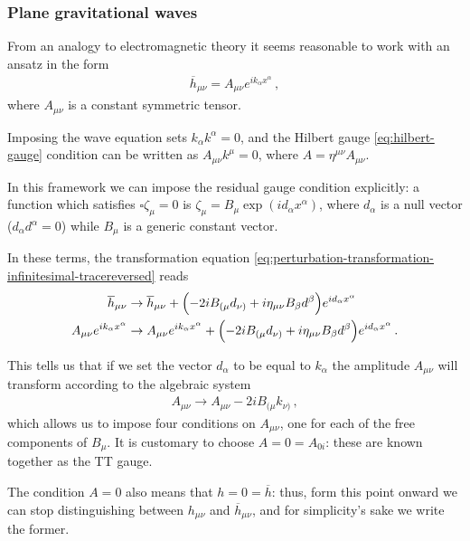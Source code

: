 \documentclass[main.tex]{subfiles}
\begin{document}
\subsubsection{Plane gravitational waves}

From an analogy to electromagnetic theory it seems reasonable to work with an ansatz in the form 
%
\begin{align}
\overline{h}_{\mu \nu } = A_{\mu \nu } e^{i k_\alpha x^{\alpha }}
\,,
\end{align}
%
where \(A_{\mu \nu }\) is a constant symmetric tensor.

Imposing the wave equation sets \(k_{\alpha } k^{\alpha } = 0\), and the Hilbert gauge \eqref{eq:hilbert-gauge} condition can be written as \(A_{\mu \nu } k^{\mu } = 0\), where \(A = \eta^{\mu \nu } A_{\mu \nu }\). 

In this framework we can impose the residual gauge condition explicitly: a function which satisfies \(\square \zeta_{\mu } = 0\) is \(\zeta_{\mu } = B_{\mu } \exp(i d_\alpha x^{\alpha })\), where \(d_\alpha \) is a null vector (\(d_\alpha d^{\alpha } = 0\)) while \(B_\mu \) is a generic constant vector.

In these terms, the transformation equation \eqref{eq:perturbation-transformation-infinitesimal-tracereversed} reads 
%
\begin{align}
\overline{h}_{\mu \nu } &\to \overline{h}_{\mu \nu } + \qty(- 2 i B_{(\mu } d_{\nu )}  + i \eta_{\mu \nu } B_{\beta } d^{\beta } ) e^{i d_\alpha x^{\alpha }} \\
A_{\mu \nu } e^{i k_\alpha x^{\alpha }} &\to A_{\mu \nu } e^{i k_\alpha x^{\alpha }} + \qty(-2 i B_{(\mu } d_{\nu )} + i \eta_{\mu \nu } B_{\beta } d^{\beta }) e^{i d_\alpha x^{\alpha }} 
\,.
\end{align}

This tells us that if we set the vector \(d_{\alpha }\) to be equal to \(k_\alpha \) the amplitude \(A_{\mu \nu }\) will transform according to the algebraic system
%
\begin{align}
A_{\mu \nu } \to A_{\mu \nu } - 2 i B_{(\mu } k_{\nu )}
\,,
\end{align}
%
which allows us to impose four conditions on \(A_{\mu \nu }\), one for each of the free components of \(B_{\mu }\). 
It is customary to choose \(A = 0 = A_{0 i }\): these are known together as the \ac{TT} gauge. 

The condition \(A = 0\) also means that \(h = 0 = \overline{h}\): thus, form this point onward we can stop distinguishing between \(h_{\mu \nu }\) and  \(\overline{h}_{\mu \nu }\), and for simplicity's sake we write the former. 
\end{document}
